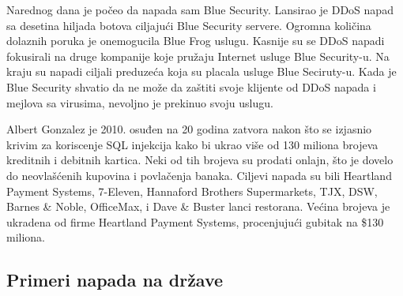 \documentclass[a4paper]{article}
\theoremstyle{break}
\begin{document}
{\begin{description}
Narednog dana je počeo da napada sam Blue Security. Lansirao je DDoS napad sa desetina hiljada botova ciljajući Blue Security servere. Ogromna količina dolaznih poruka je onemogucila Blue Frog uslugu. Kasnije su se DDoS napadi fokusirali na druge kompanije koje pružaju Internet usluge Blue Security-u. Na kraju su napadi ciljali preduzeća koja su placala usluge Blue Seciruty-u. Kada je Blue Security shvatio da ne može da zaštiti svoje klijente od DDoS napada i mejlova sa virusima, nevoljno je prekinuo svoju uslugu.



\item[ALBERT GONZALEZ] Albert Gonzalez je 2010. osuđen na 20 godina zatvora nakon što se izjasnio krivim za koriscenje SQL injekcija kako bi ukrao više od 130 miliona brojeva kreditnih i debitnih kartica. Neki od tih brojeva su prodati onlajn, što je dovelo do neovlašćenih kupovina i povlačenja banaka. Ciljevi napada su bili Heartland Payment Systems,  7-Eleven,  Hannaford Brothers Supermarkets,  TJX,  DSW,  Barnes \& Noble, OfficeMax, i Dave \& Buster lanci restorana. Većina brojeva je ukradena od firme Heartland Payment Systems, procenjujući gubitak na \$130 miliona.
\end{description}

\subsection{Primeri napada na države}
\label{subsec:primeri_napada_drzave}

}
\end{document}
